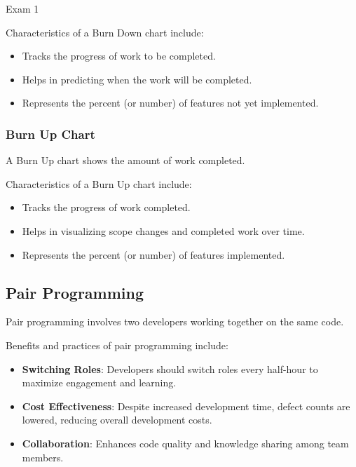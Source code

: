 \begin{examnotes}{Exam 1}
    \begin{highlight}
        Characteristics of a Burn Down chart include:
        
        \begin{itemize}
            \item Tracks the progress of work to be completed.
            \item Helps in predicting when the work will be completed.
            \item Represents the percent (or number) of features not yet implemented.
        \end{itemize}
    \end{highlight}
    
    \subsubsection*{Burn Up Chart}
    
    A Burn Up chart shows the amount of work completed.
    
    \begin{highlight}
        Characteristics of a Burn Up chart include:
        
        \begin{itemize}
            \item Tracks the progress of work completed.
            \item Helps in visualizing scope changes and completed work over time.
            \item Represents the percent (or number) of features implemented.
        \end{itemize}
    \end{highlight}
    
    \subsection*{Pair Programming}
    
    Pair programming involves two developers working together on the same code.
    
    \begin{highlight}
        Benefits and practices of pair programming include:
        
        \begin{itemize}
            \item \textbf{Switching Roles}: Developers should switch roles every half-hour to maximize engagement and learning.
            \item \textbf{Cost Effectiveness}: Despite increased development time, defect counts are lowered, reducing overall development costs.
            \item \textbf{Collaboration}: Enhances code quality and knowledge sharing among team members.
        \end{itemize}
    \end{highlight}
    

\end{examnotes}
